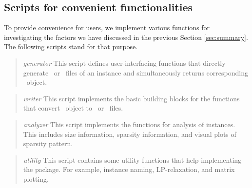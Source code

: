 \subsection{Scripts for convenient functionalities}
To provide convenience for users, we implement various functions for investigating the factors we have discussed in the previous Section \ref{sec:summary}. The following scripts stand for that purpose.
\begin{quotation}
	\noindent\textit{generator} This script defines user-interfacing functions that directly generate \smps\ or \mps\ files of an instance and simultaneously returns corresponding \jumpmodel\ object.
\end{quotation}

\begin{quotation}
	\noindent\textit{writer} This script implements the basic building blocks for the functions that convert \jumpmodel\ object to \smps\ or \mps\ files. 
\end{quotation}


\begin{quotation}
	\noindent\textit{analyzer} This script implements the functions for analysis of instances. This includes size information, sparsity information, and visual plots of sparsity pattern.
\end{quotation}

\begin{quotation}
	\noindent\textit{utility} This script contains some utility functions that help implementing the package. For example, instance naming, LP-relaxation, and matrix plotting.
\end{quotation}



